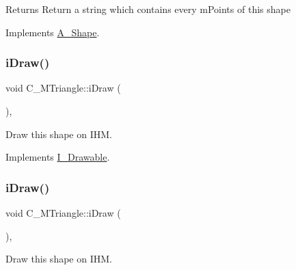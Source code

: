 \begin{DoxyReturn}{Returns}
Return a string which contains every m\+Points of this shape 
\end{DoxyReturn}


Implements \hyperlink{classA__Shape_ad8804b4e74543db374af6892367b7c2e}{A\+\_\+\+Shape}.

\mbox{\label{classC__MTriangle_ae75dd212f0b580664affc740945c8d0b}} 
\subsubsection{\texorpdfstring{i\+Draw()}{iDraw()}\hspace{0.1cm}{\footnotesize\ttfamily [1/4]}}
{\footnotesize\ttfamily void C\+\_\+\+M\+Triangle\+::i\+Draw (\begin{DoxyParamCaption}{ }\end{DoxyParamCaption})\hspace{0.3cm}{\ttfamily [override]}, {\ttfamily [virtual]}}



Draw this shape on I\+HM. 



Implements \hyperlink{classI__Drawable_ae24c65000977a805f52ce032321cd86f}{I\+\_\+\+Drawable}.

\mbox{\label{classC__MTriangle_ae75dd212f0b580664affc740945c8d0b}} 
\subsubsection{\texorpdfstring{i\+Draw()}{iDraw()}\hspace{0.1cm}{\footnotesize\ttfamily [2/4]}}
{\footnotesize\ttfamily void C\+\_\+\+M\+Triangle\+::i\+Draw (\begin{DoxyParamCaption}{ }\end{DoxyParamCaption})\hspace{0.3cm}{\ttfamily [override]}, {\ttfamily [virtual]}}



Draw this shape on I\+HM. 



